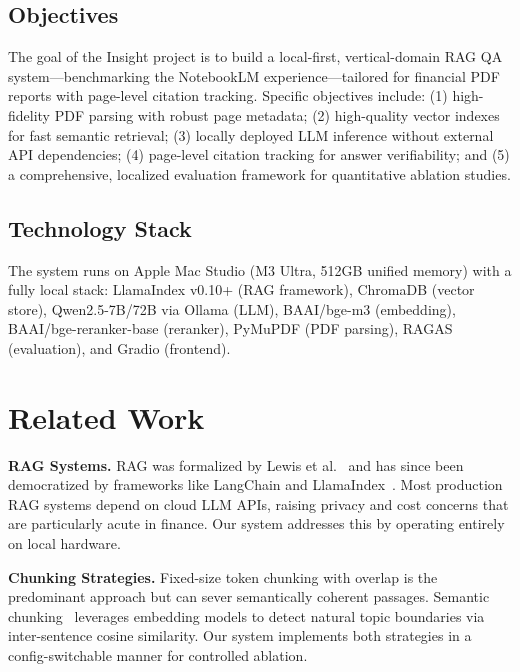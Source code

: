 \documentclass[11pt, a4paper]{article}
\begin{document}
\subsection{Objectives}

The goal of the Insight project is to build a local-first, vertical-domain RAG QA system---benchmarking the NotebookLM experience---tailored for financial PDF reports with page-level citation tracking. Specific objectives include: (1) high-fidelity PDF parsing with robust page metadata; (2) high-quality vector indexes for fast semantic retrieval; (3) locally deployed LLM inference without external API dependencies; (4) page-level citation tracking for answer verifiability; and (5) a comprehensive, localized evaluation framework for quantitative ablation studies.

\subsection{Technology Stack}

The system runs on Apple Mac Studio (M3 Ultra, 512GB unified memory) with a fully local stack: LlamaIndex v0.10+ (RAG framework), ChromaDB (vector store), Qwen2.5-7B/72B via Ollama (LLM), BAAI/bge-m3 (embedding), BAAI/bge-reranker-base (reranker), PyMuPDF (PDF parsing), RAGAS (evaluation), and Gradio (frontend).

\section{Related Work}

\noindent\textbf{RAG Systems.} RAG was formalized by Lewis et al.~\cite{lewis2020} and has since been democratized by frameworks like LangChain and LlamaIndex~\cite{llamaindex}. Most production RAG systems depend on cloud LLM APIs, raising privacy and cost concerns that are particularly acute in finance. Our system addresses this by operating entirely on local hardware.

\noindent\textbf{Chunking Strategies.} Fixed-size token chunking with overlap is the predominant approach but can sever semantically coherent passages. Semantic chunking~\cite{bge} leverages embedding models to detect natural topic boundaries via inter-sentence cosine similarity. Our system implements both strategies in a config-switchable manner for controlled ablation.
\end{document}
